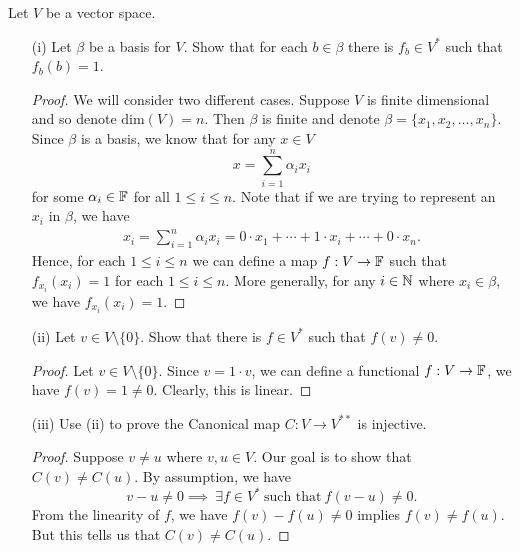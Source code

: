 \documentclass[a4paper]{article}
\begin{document}
\begin{problem}
    Let \( V  \) be a vector space.
\end{problem}
\begin{enumerate}
    \item[(i)] Let \( \beta  \) be a basis for \( V  \). Show that for each \( b \in \beta  \) there is \( {f}_{b} \in V^{*}  \) such that \( {f}_{b}(b) = 1  \).
        \begin{proof}
        We will consider two different cases. Suppose \( V  \) is finite dimensional and so denote \( \text{dim}(V) = n  \). Then \( \beta  \) is finite and denote \( \beta = \{ {x}_{1}, {x}_{2}, \dots , {x}_{n} \}  \). Since \( \beta  \) is a basis, we know that for any \( x \in V  \)
        \[  x = \sum_{ i=1  }^{ n } {\alpha}_{i} {x}_{i} \]
        for some \( {\alpha}_{i} \in \mathbb{F}   \) for all \( 1 \leq i \leq n  \). Note that if we are trying to represent an \( {x}_{i} \) in \( \beta  \), we have
        \begin{align*}
        {x}_{i} = \sum_{ i=1  }^{ n } {\alpha}_{i} {x}_{i} = 0 \cdot {x}_{1} + \cdots +  1 \cdot {x}_{i} + \cdots + 0 \cdot {x}_{n}. 
        \end{align*}
        Hence, for each \( 1 \leq i \leq n  \) we can define a map \( f: V \to \mathbb{F}  \) such that \( {f}_{{x}_{i}}({x}_{i}) = 1  \) for each \( 1 \leq i \leq n  \). More generally, for any \( i \in \mathbb{N} \) where \( {x}_{i} \in \beta  \), we have \( {f}_{{x}_{i}}({x}_{i}) = 1  \).  
        \end{proof}
    \item[(ii)] Let \( v \in V \setminus  \{ 0  \}  \). Show that there is \( f \in V^{*} \) such that \( f(v) \neq 0  \).
        \begin{proof}
        Let \( v \in V \setminus \{ 0  \}  \). Since \( v = 1 \cdot v  \), we can define a functional \( f: V \to \mathbb{F}  \), we have \( f(v) = 1 \neq 0  \). Clearly, this is linear. 
    \end{proof}
    \item[(iii)] Use (ii) to prove the Canonical map \( C: V \to V^{**} \) is injective.
        \begin{proof}
        Suppose \( v \neq u  \) where \( v, u \in V  \). Our goal is to show that \( C(v) \neq C(u) \). By assumption, we have 
        \[  v- u \neq 0 \implies \ \exists f \in V^{*} \ \text{such that} \ f(v - u) \neq 0.   \]
        From the linearity of \( f  \), we have \( f(v) - f(u) \neq 0  \) implies \( f(v) \neq f(u) \). But this tells us that \( C(v) \neq C(u) \).
        \end{proof}
\end{enumerate}
\end{document}
